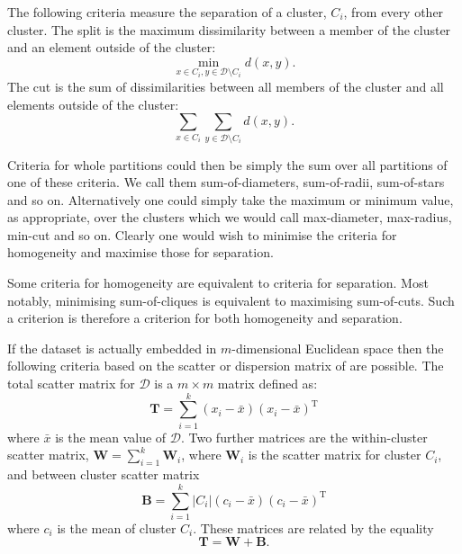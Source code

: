 \documentclass[a4paper]{report}
\newcommand{\dset}{\mathcal{D}}
\begin{document}
The following criteria measure the separation of a cluster, $C_i$, from every
other cluster.  The split is the maximum dissimilarity between a member of the
cluster and an element outside of the cluster:
\begin{equation*}
  \min_{x \in C_i, y \in \dset \setminus C_i} d(x,y).
\end{equation*}
The cut is the sum of dissimilarities between all members of the cluster and
all elements outside of the cluster:
\begin{equation*}
  \sum_{x \in C_i} \sum_{y \in \dset \setminus C_i} d(x,y).
\end{equation*}

Criteria for whole partitions could then be simply the sum over all partitions
of one of these criteria.  We call them sum-of-diameters, sum-of-radii,
sum-of-stars and so on.  Alternatively one could simply take the maximum or
minimum value, as appropriate, over the clusters which we would call
max-diameter, max-radius, min-cut and so on.  Clearly one would wish to
minimise the criteria for homogeneity and maximise those for separation.

Some criteria for homogeneity are equivalent to criteria for separation.  Most
notably, minimising sum-of-cliques is equivalent to maximising sum-of-cuts.
Such a criterion is therefore a criterion for both homogeneity and separation.

If the dataset is actually embedded in $m$-dimensional Euclidean space then
the following criteria based on the scatter or dispersion matrix of
\citet{wilks60} are possible.  The total scatter matrix for $\dset$ is a $m
\times m$ matrix defined
as:
\begin{equation*}
  \mathbf{T} = \sum_{i=1}^{k} (x_i - \bar{x})(x_i - \bar{x})^{\mathrm{T}}
\end{equation*}
where $\bar{x}$ is the mean value of $\dset$.  Two further matrices are
the within-cluster scatter matrix, $\mathbf{W} = \sum_{i=1}^{k} \mathbf{W}_i$,
where $\mathbf{W}_i$ is the scatter matrix for cluster $C_i$, and between
cluster scatter matrix
\begin{equation*}
  \mathbf{B} =
  \sum_{i=1}^{k} |C_i| (c_i - \bar{x}) (c_i - \bar{x})^{\mathrm{T}}
\end{equation*}
where $c_i$ is the mean of cluster $C_i$.  These matrices are related by the
equality
\begin{equation*}
  \mathbf{T} = \mathbf{W} + \mathbf{B}.
\end{equation*}
\end{document}

